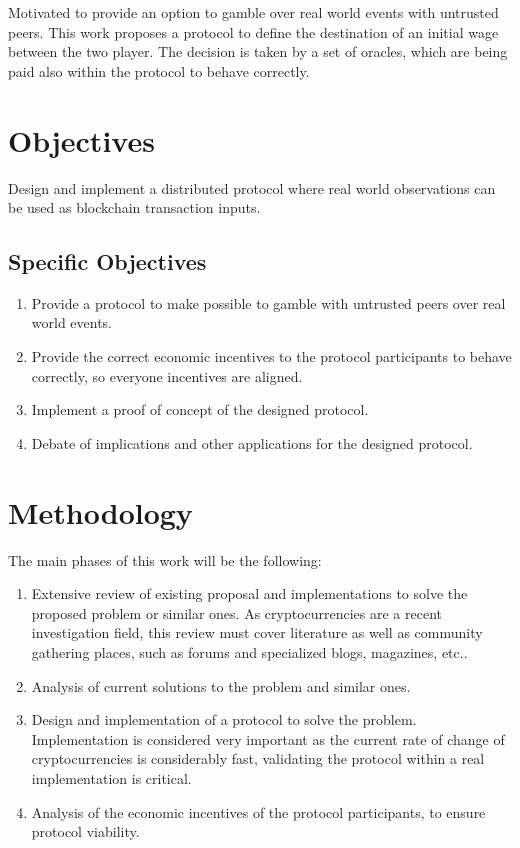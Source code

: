 Motivated to provide an option to gamble over real world events with untrusted
 peers. This work proposes a protocol to define the destination of an initial
 wage between the two player. The decision is taken by a set of oracles, which
 are being paid also within the protocol to behave correctly.

\section{Objectives}
Design and implement a distributed protocol where real world observations can
  be used as blockchain transaction inputs.

\subsection{Specific Objectives}
\begin{enumerate}
	\item Provide a protocol to make possible to gamble with untrusted peers over
	  real world events.
	\item Provide the correct economic incentives to the protocol participants to
	  behave correctly, so everyone incentives are aligned.
	\item Implement a proof of concept of the designed protocol.
	\item Debate of implications and other applications for the designed protocol.
\end{enumerate}

\section{Methodology}
The main phases of this work will be the following:
\begin{enumerate}
	\item Extensive review of existing proposal and implementations to solve
	  the proposed problem or similar ones. As cryptocurrencies are a recent
	  investigation field, this review must cover literature as well as
	  community gathering places, such as forums and specialized blogs, magazines,
	  etc..
  \item Analysis of current solutions to the problem and similar ones.
  \item Design and implementation of a protocol to solve the problem.
    Implementation is considered very important as the current rate of change
    of cryptocurrencies is considerably fast, validating the protocol within a
    real implementation is critical.
  \item Analysis of the economic incentives of the protocol participants, to
    ensure protocol viability.
\end{enumerate}

